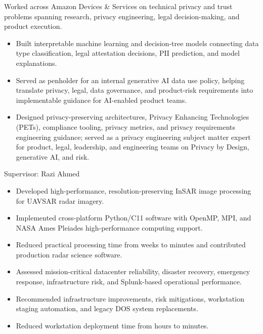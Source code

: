 \documentclass[11pt,letterpaper,sans]{moderncv}        %
\begin{document}
{Worked across Amazon Devices \& Services on technical privacy and trust problems spanning research, privacy engineering, legal decision-making, and product execution.
\begin{itemize}
    \item Built interpretable machine learning and decision-tree models connecting data type classification, legal attestation decisions, PII prediction, and model explanations.
    \item Served as penholder for an internal generative AI data use policy, helping translate privacy, legal, data governance, and product-risk requirements into implementable guidance for AI-enabled product teams.
    \item Designed privacy-preserving architectures, Privacy Enhancing Technologies (PETs), compliance tooling, privacy metrics, and privacy requirements engineering guidance; served as a privacy engineering subject matter expert for product, legal, leadership, and engineering teams on Privacy by Design, generative AI, and risk.
\end{itemize}}

{Supervisor: Razi Ahmed
\begin{itemize}%
\item Developed high-performance, resolution-preserving InSAR image processing for UAVSAR radar imagery.
\item Implemented cross-platform Python/C11 software with OpenMP, MPI, and NASA Ames Pleiades high-performance computing support.
\item Reduced practical processing time from weeks to minutes and contributed production radar science software.
\end{itemize}}

{
\begin{itemize}%
\item Assessed mission-critical datacenter reliability, disaster recovery, emergency response, infrastructure risk, and Splunk-based operational performance.
\item Recommended infrastructure improvements, risk mitigations, workstation staging automation, and legacy DOS system replacements.
\item Reduced workstation deployment time from hours to minutes.
\end{itemize}}
\end{document}
